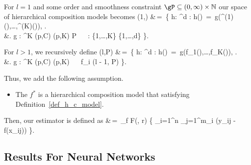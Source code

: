 \documentclass[twoside,11pt]{article}
\begin{document}
For \( l = 1 \) and some order and smoothness constraint \( \gP \subseteq (0,\infty) \times \mathbb{N} \) our space of hierarchical composition models becomes
\bea
{}(1,\gP) &\,=\, \left\{ h: ^d \rightarrow {} : h() \,=\, g(\pi^{(1)}(),\ldots,\pi^{(K)}()), \right. \\ 
&\left. g : ^K \rightarrow {}  (p,C) (p,K) \in P \,\,\,\,\,\, \pi : \{1,\ldots,K\} \rightarrow \{1,\ldots,d\} \right\}. 
\bea 

For \( l > 1 \), we recursively define
\bea 
{}(l,P) &\,=\, \left\{ h: ^d \rightarrow {} : h() \,=\, g(f_1(),\ldots,f_K()),  \right. \\ 
&\left. g : ^K \rightarrow {}  (p,C) (p,K) \in \gP \,\,\,\,\,\, f_i \in {}(l - 1, P) \right\}.
\bea 

Thus, we add the following assumption.
\begin{assumption}
\label{assump_nn}
\begin{itemize}
    \item The $f^*$ is a hierarchical composition model that satisfying Definition~\ref{def_h_c_model}.
\end{itemize}
    
\end{assumption}

Then, our estimator is defined as 
\beq
\label{nn_main_est}
 &\,=\, \arg\min_{f \in F(\gL, r)} \left\{  \sum_{i=1}^n  \sum_{j=1}^{m_i} \rho(y_{ij} - f(x_{ij})) \right\}. \\
\beq

\subsection{Results For Neural Networks}
\end{document}
